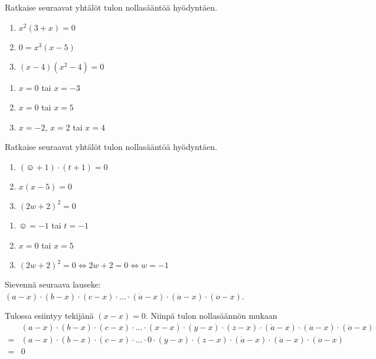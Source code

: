 \begin{tehtava}
    Ratkaise seuraavat yhtälöt tulon nollasääntöä hyödyntäen.
    \begin{enumerate}
        \item $x^2(3+x)=0$
        \item $0=x^3(x-5)$
        \item $(x-4)(x^2-4)=0$
    \end{enumerate}
    \begin{vastaus}
        \begin{enumerate}
            \item $x=0$ tai $x=-3$
            \item $x=0$ tai $x=5$
            \item $x=-2$, $x=2$ tai $x=4$
        \end{enumerate}
    \end{vastaus}
\end{tehtava}


\begin{tehtava}
    Ratkaise seuraavat yhtälöt tulon nollasääntöä hyödyntäen.
    \begin{enumerate}
        \item $(\smiley{}+1)\cdot (t+1)=0$
        \item $x(x-5)=0$
        \item $(2w+2)^2=0$
    \end{enumerate}
    \begin{vastaus}
        \begin{enumerate}
            \item $\smiley{}=-1$ tai $t=-1$
            \item $x=0$ tai $x=5$
            \item $(2w+2)^2=0 \Leftrightarrow 2w+2=0 \Leftrightarrow w=-1$
        \end{enumerate}
    \end{vastaus}
\end{tehtava}

\begin{tehtava}
	Sievennä seuraava lauseke: $(a-x)\cdot(b-x)\cdot(c-x)\cdot...\cdot(\mathring{a}-x)\cdot(\ddot{a}-x)\cdot(\ddot{o}-x)$.
    \begin{vastaus}
		Tulossa esiintyy tekijänä $(x-x)=0$. Niinpä tulon nollasäännön mukaan
		\begin{align*}
 			&(a-x)\cdot(b-x)\cdot(c-x)\cdot...\cdot(x-x)\cdot(y-x)\cdot(z-x)\cdot(\mathring{a}-x)\cdot(\ddot{a}-x)\cdot(\ddot{o}-x) \\
 			=&(a-x)\cdot(b-x)\cdot(c-x)\cdot...\cdot 0\cdot(y-x)\cdot(z-x)\cdot(\mathring{a}-x)\cdot(\ddot{a}-x)\cdot(\ddot{o}-x) \\
 			=&0
		\end{align*}
   \end{vastaus}
\end{tehtava}
